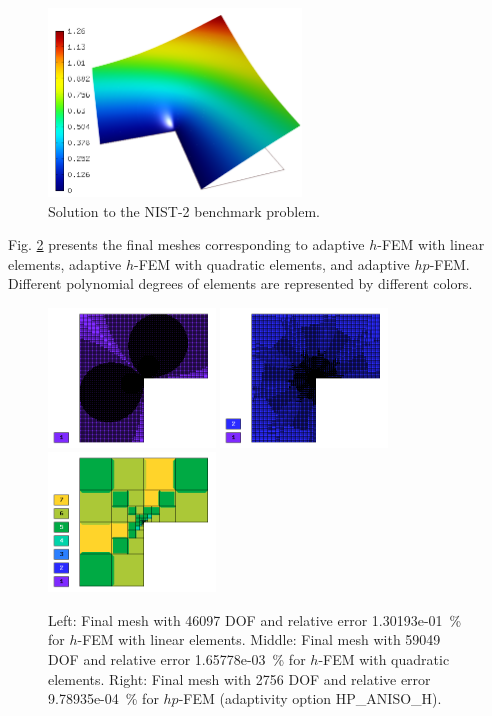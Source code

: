 \documentclass[12pt]{elsarticle}
\begin{document}
\begin{figure}[H]
\centering
\vspace{-3mm}
\includegraphics[height=5cm]{nist/nist-2/solution.png}
\vspace{-3mm}
\caption{Solution to the NIST-2 benchmark problem.}
\label{fig:sln-nist02}
\end{figure}

Fig. \ref{fig:nist-2-hp-aniso} presents the final meshes corresponding to adaptive $h$-FEM with
linear elements, adaptive $h$-FEM with quadratic elements, and adaptive $hp$-FEM. Different
polynomial degrees of elements are represented by different colors.

\begin{figure}[H]
\centering
\vspace{-5mm}
\includegraphics[height=3.7cm]{nist/nist-2/mesh_h1_aniso.png}
\includegraphics[height=3.7cm]{nist/nist-2/mesh_h2_aniso.png}
\includegraphics[height=3.7cm]{nist/nist-2/mesh_hp_aniso.png}
\vspace{-3mm}
\caption{
Left: Final mesh with 46097 DOF and relative error 1.30193e-01~\% for $h$-FEM with linear elements.
Middle: Final mesh with 59049 DOF and relative error 1.65778e-03~\% for $h$-FEM with quadratic elements.
Right: Final mesh with 2756 DOF and relative error 9.78935e-04~\% for $hp$-FEM (adaptivity option HP\_ANISO\_H).}
\label{fig:nist-2-hp-aniso}
\vspace{-3mm}
\end{figure}
\end{document}
